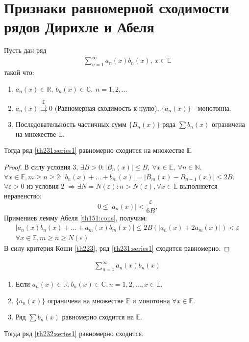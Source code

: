 \section{Признаки равномерной сходимости рядов Дирихле и Абеля}
\begin{theorem}
  Пусть дан ряд
  \begin{gather}
    \sum\limits_{n = 1}^{\infty} a_n(x) b_n(x), \ x \in \mathbb{E} \label{th231:series1}
  \end{gather}
  такой что:
  \begin{enumerate}
    \item $a_n(x) \in \mathbb{R}, \ b_n(x) \in \mathbb{C}, \ n = 1, 2, \dots$
    \item $a_n(x) \stackrel{\mathrm{\mathbb{E}}}{\rightrightarrows} 0$
      (Равномерная сходимость к нулю), $\{a_n(x)\}$ - монотонна.
    \item Последовательность частичных сумм $\{B_n(x)\}$ ряда $\sum b_n(x)$ ограничена на множестве $\mathbb{E}$.
  \end{enumerate}
  Тогда ряд \eqref{th231:series1} равномерно сходится на множестве $\mathbb{E}$.
\end{theorem}

\begin{proof}
  В силу условия 3, $\exists B > 0: |B_n(x)| \leq B, \ \forall x \in \mathbb{E}, \
  \forall n \in \mathbb{N}$. \\
  $\forall x \in \mathbb{E}, m \geq n \geq 2: |b_n(x) + \dots + b_m(x)| =
  |B_m(x) - B_{n-1}(x)| \leq 2B$. \\
  $\forall \varepsilon > 0$ из условия 2 $\Rightarrow \exists N = N(\varepsilon):
  n > N(\varepsilon), \forall x \in \mathbb{E}$ выполняется неравенство:
  $$0 \leq |a_n(x)| < \frac{\varepsilon}{6B}.$$
  Примениев лемму Абеля \eqref{th151:cons}, получим:
  \begin{gather*}
    |a_n(x) b_n(x) + \dots + a_m(x) b_m(x)| \leq 2B(|a_n(x) + 2a_m(x)|) <
    \varepsilon \\
    \forall x \in \mathbb{E},
    m \geq n \geq N(\varepsilon)
  \end{gather*}
  В силу критерия Коши \eqref{th223}, ряд \eqref{th231:series1} сходится равномерно.
\end{proof}

\begin{theorem}
  \label{th232}
  \begin{gather}
    \sum\limits_{n = 1}^{\infty} a_n(x) b_n(x) \label{th232:series1}
  \end{gather}
  \begin{enumerate}
    \item Если $a_n(x) \in \mathbb{R}, b_n(x) \in \mathbb{C}, n = 1, 2, \dots,
      x \in \mathbb{E}$.
    \item $\{a_n(x)\}$ ограничена на множестве $\mathbb{E}$ и монотонна
      $\forall x \in \mathbb{E}$.
    \item Ряд $\sum b_n(x)$ равномерно сходится на $\mathbb{E}$.
  \end{enumerate}
  Тогда ряд \eqref{th232:series1} равномерно сходится.
\end{theorem}

